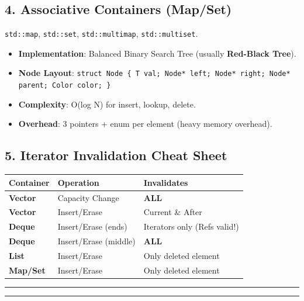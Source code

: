 \hypertarget{associative-containers-mapset}{%
\subsection{4. Associative Containers
(Map/Set)}\label{associative-containers-mapset}}

\passthrough{\lstinline!std::map!}, \passthrough{\lstinline!std::set!},
\passthrough{\lstinline!std::multimap!},
\passthrough{\lstinline!std::multiset!}.

\begin{itemize}
\tightlist
\item
  \textbf{Implementation}: Balanced Binary Search Tree (usually
  \textbf{Red-Black Tree}).
\item
  \textbf{Node Layout}:
  \passthrough{\lstinline!struct Node \{ T val; Node* left; Node* right; Node* parent; Color color; \}!}
\item
  \textbf{Complexity}: O(log N) for insert, lookup, delete.
\item
  \textbf{Overhead}: 3 pointers + enum per element (heavy memory
  overhead).
\end{itemize}

\hypertarget{iterator-invalidation-cheat-sheet}{%
\subsection{5. Iterator Invalidation Cheat
Sheet}\label{iterator-invalidation-cheat-sheet}}

\begin{longtable}[]{@{}lll@{}}
\toprule
Container & Operation & Invalidates \\
\midrule
\endhead
\textbf{Vector} & Capacity Change & \textbf{ALL} \\
\textbf{Vector} & Insert/Erase & Current \& After \\
\textbf{Deque} & Insert/Erase (ends) & Iterators only (Refs valid!) \\
\textbf{Deque} & Insert/Erase (middle) & \textbf{ALL} \\
\textbf{List} & Insert/Erase & Only deleted element \\
\textbf{Map/Set} & Insert/Erase & Only deleted element \\
\bottomrule
\end{longtable}

\begin{center}\rule{0.5\linewidth}{0.5pt}\end{center}

\begin{center}\rule{0.5\linewidth}{0.5pt}\end{center}
